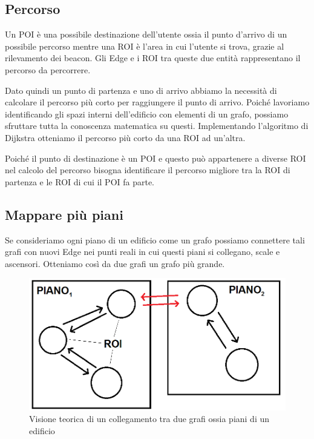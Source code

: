 \documentclass[../ManualeSviluppatore.tex]{subfiles}
\begin{document}
	
	\subsection{Percorso}
	Un POI è una possibile destinazione dell'utente ossia il punto d'arrivo di un possibile percorso mentre una ROI è l'area in cui l'utente si trova, grazie al rilevamento dei \gls{beacon}. Gli Edge e i ROI tra queste due entità rappresentano il percorso da percorrere.
	
	Dato quindi un punto di partenza e uno di arrivo abbiamo la necessità di calcolare il percorso più corto per raggiungere il punto di arrivo. Poiché lavoriamo identificando gli spazi interni dell'edificio con elementi di un grafo, possiamo sfruttare tutta la conoscenza matematica su questi.
	Implementando l'algoritmo di Dijkstra otteniamo il percorso più corto da una ROI ad un'altra.
	
	Poiché il punto di destinazione è un POI e questo può appartenere a diverse ROI nel calcolo del percorso bisogna identificare il percorso migliore tra la ROI di partenza e le ROI di cui il POI fa parte.

	
	
	\subsection{Mappare più piani}
	
		Se consideriamo ogni piano di un edificio come un grafo possiamo connettere tali grafi con nuovi Edge nei punti reali in cui questi piani si collegano, scale e ascensori. Otteniamo così da due grafi un grafo più grande.
		
		\begin{figure} [h]
			\centering
			\includegraphics[scale=0.4]{img/GRAFI-CONNESSI}
			\caption{Visione teorica di un collegamento tra due grafi ossia piani di un edificio}
			\label{fig:GRAFI-CONNESSI}
	\end{figure}
	
\end{document}
